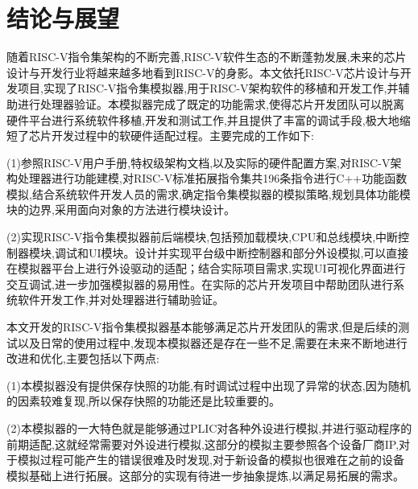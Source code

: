 
\chapter{结论与展望}
随着RISC-V指令集架构的不断完善,RISC-V软件生态的不断蓬勃发展,未来的芯片设计与开发行业将越来越多地看到RISC-V的身影。本文依托RISC-V芯片设计与开发项目,实现了RISC-V指令集模拟器,用于RISC-V架构软件的移植和开发工作,并辅助进行处理器验证。本模拟器完成了既定的功能需求,使得芯片开发团队可以脱离硬件平台进行系统软件移植,开发和测试工作,并且提供了丰富的调试手段,极大地缩短了芯片开发过程中的软硬件适配过程。主要完成的工作如下:


(1)参照RISC-V用户手册,特权级架构文档,以及实际的硬件配置方案,对RISC-V架构处理器进行功能建模,对RISC-V标准拓展指令集共196条指令进行C++功能函数模拟,结合系统软件开发人员的需求,确定指令集模拟器的模拟策略,规划具体功能模块的边界,采用面向对象的方法进行模块设计。


(2)实现RISC-V指令集模拟器前后端模块,包括预加载模块,CPU和总线模块,中断控制器模块,调试和UI模块。设计并实现平台级中断控制器和部分外设模拟,可以直接在模拟器平台上进行外设驱动的适配；结合实际项目需求,实现UI可视化界面进行交互调试,进一步加强模拟器的易用性。在实际的芯片开发项目中帮助团队进行系统软件开发工作,并对处理器进行辅助验证。


本文开发的RISC-V指令集模拟器基本能够满足芯片开发团队的需求,但是后续的测试以及日常的使用过程中,发现本模拟器还是存在一些不足,需要在未来不断地进行改进和优化,主要包括以下两点:


(1)本模拟器没有提供保存快照的功能,有时调试过程中出现了异常的状态,因为随机的因素较难复现,所以保存快照的功能还是比较重要的。


(2)本模拟器的一大特色就是能够通过PLIC对各种外设进行模拟,并进行驱动程序的前期适配,这就经常需要对外设进行模拟,这部分的模拟主要参照各个设备厂商IP,对于模拟过程可能产生的错误很难及时发现,对于新设备的模拟也很难在之前的设备模拟基础上进行拓展。这部分的实现有待进一步抽象提炼,以满足易拓展的需求。

